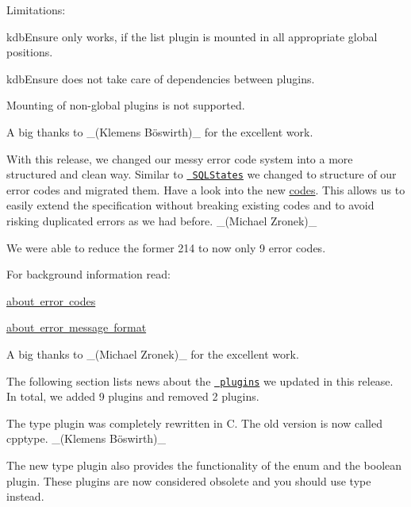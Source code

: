 Limitations\+:


\begin{DoxyItemize}
\item {\ttfamily kdb\+Ensure} only works, if the {\ttfamily list} plugin is mounted in all appropriate global positions.
\item {\ttfamily kdb\+Ensure} does not take care of dependencies between plugins.
\item Mounting of non-\/global plugins is not supported.
\end{DoxyItemize}

A big thanks to \+\_\+(Klemens Böswirth)\+\_\+ for the excellent work.

With this release, we changed our messy error code system into a more structured and clean way. Similar to \href{https://www.ibm.com/support/knowledgecenter/en/SSGU8G_12.1.0/com.ibm.sqls.doc/ids_sqs_0809.htm}{\texttt{ S\+Q\+L\+States}} we changed to structure of our error codes and migrated them. Have a look into the new \mbox{\hyperlink{doc_decisions_error_codes_md}{codes}}. This allows us to easily extend the specification without breaking existing codes and to avoid risking duplicated errors as we had before. \+\_\+(\+Michael Zronek)\+\_\+

We were able to reduce the former 214 to now only 9 error codes.

For background information read\+:


\begin{DoxyItemize}
\item \mbox{\hyperlink{doc_decisions_error_codes_md}{about error codes}}
\item \mbox{\hyperlink{doc_decisions_error_message_format_md}{about error message format}}
\end{DoxyItemize}

A big thanks to \+\_\+(\+Michael Zronek)\+\_\+ for the excellent work.

The following section lists news about the \href{https://www.libelektra.org/plugins/readme}{\texttt{ plugins}} we updated in this release. In total, we added 9 plugins and removed 2 plugins.

The {\ttfamily type} plugin was completely rewritten in C. The old version is now called {\ttfamily cpptype}. \+\_\+(Klemens Böswirth)\+\_\+

The new {\ttfamily type} plugin also provides the functionality of the {\ttfamily enum} and the {\ttfamily boolean} plugin. These plugins are now considered obsolete and you should use {\ttfamily type} instead.

